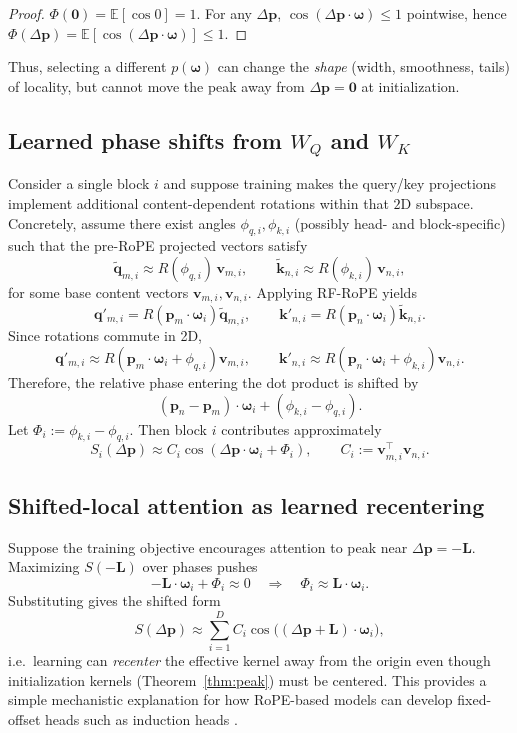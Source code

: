 \documentclass{article}
\theoremstyle{plain}
\theoremstyle{remark}
\begin{document}
\begin{proof}
$\Phi(\mathbf{0})=\mathbb{E}[\cos 0]=1$. For any $\Delta\mathbf{p}$, $\cos(\Delta\mathbf{p}\cdot\boldsymbol{\omega})\le 1$ pointwise, hence $\Phi(\Delta\mathbf{p})=\mathbb{E}[\cos(\Delta\mathbf{p}\cdot\boldsymbol{\omega})]\le 1$.
\end{proof}

Thus, selecting a different $p(\boldsymbol{\omega})$ can change the \emph{shape} (width, smoothness, tails) of locality, but cannot move the peak away from $\Delta\mathbf{p}=\mathbf{0}$ at initialization.

\subsection{Learned phase shifts from $W_Q$ and $W_K$}
Consider a single block $i$ and suppose training makes the query/key projections implement additional content-dependent rotations within that $2$D subspace. Concretely, assume there exist angles $\phi_{q,i},\phi_{k,i}$ (possibly head- and block-specific) such that the pre-RoPE projected vectors satisfy
\[
\tilde{\mathbf{q}}_{m,i}\approx R(\phi_{q,i})\,\mathbf{v}_{m,i},
\qquad
\tilde{\mathbf{k}}_{n,i}\approx R(\phi_{k,i})\,\mathbf{v}_{n,i},
\]
for some base content vectors $\mathbf{v}_{m,i},\mathbf{v}_{n,i}$.
Applying RF-RoPE yields
\[
\mathbf{q}'_{m,i}=R(\mathbf{p}_m\cdot\boldsymbol{\omega}_i)\tilde{\mathbf{q}}_{m,i},
\qquad
\mathbf{k}'_{n,i}=R(\mathbf{p}_n\cdot\boldsymbol{\omega}_i)\tilde{\mathbf{k}}_{n,i}.
\]
Since rotations commute in 2D,
\[
\mathbf{q}'_{m,i}\approx R(\mathbf{p}_m\cdot\boldsymbol{\omega}_i+\phi_{q,i})\mathbf{v}_{m,i},
\qquad
\mathbf{k}'_{n,i}\approx R(\mathbf{p}_n\cdot\boldsymbol{\omega}_i+\phi_{k,i})\mathbf{v}_{n,i}.
\]
Therefore, the relative phase entering the dot product is shifted by
\[
(\mathbf{p}_n-\mathbf{p}_m)\cdot\boldsymbol{\omega}_i + (\phi_{k,i}-\phi_{q,i}).
\]
Let $\Phi_i:=\phi_{k,i}-\phi_{q,i}$. Then block $i$ contributes approximately
\[
S_i(\Delta\mathbf{p})\approx C_i\cos(\Delta\mathbf{p}\cdot\boldsymbol{\omega}_i+\Phi_i),
\qquad
C_i:=\mathbf{v}_{m,i}^\top\mathbf{v}_{n,i}.
\]

\subsection{Shifted-local attention as learned recentering}
Suppose the training objective encourages attention to peak near $\Delta\mathbf{p}=-\mathbf{L}$. Maximizing $S(-\mathbf{L})$ over phases pushes
\[
-\mathbf{L}\cdot\boldsymbol{\omega}_i+\Phi_i \approx 0
\quad\Longrightarrow\quad
\Phi_i \approx \mathbf{L}\cdot\boldsymbol{\omega}_i.
\]
Substituting gives the shifted form
\[
S(\Delta\mathbf{p})
\approx \sum_{i=1}^{D} C_i\cos\big((\Delta\mathbf{p}+\mathbf{L})\cdot\boldsymbol{\omega}_i\big),
\]
i.e.\ learning can \emph{recenter} the effective kernel away from the origin even though initialization kernels (Theorem~\ref{thm:peak}) must be centered. This provides a simple mechanistic explanation for how RoPE-based models can develop fixed-offset heads such as induction heads \cite{olsson2022incontext}.
\end{document}
